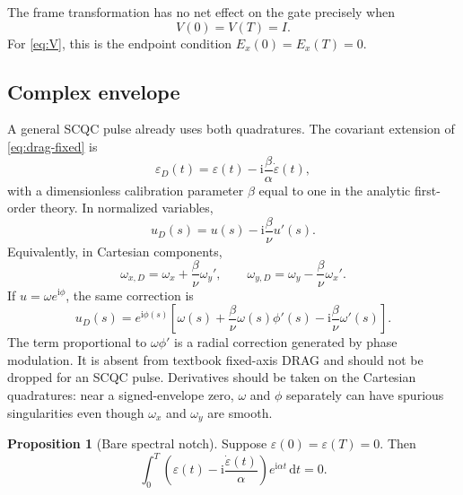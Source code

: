 \documentclass[11pt,a4paper]{article}
\theoremstyle{definition}
\newtheorem{proposition}{Proposition}
\newcommand{\dd}{\mathrm{d}}
\newcommand{\ii}{\mathrm{i}}
\newcommand{\eps}{\varepsilon}
\begin{document}
The frame transformation has no net effect on the gate precisely when
\begin{equation}
  V(0)=V(T)=I.
\end{equation}
For \eqref{eq:V}, this is the endpoint condition \(E_x(0)=E_x(T)=0\).

\subsection{Complex envelope}

A general SCQC pulse already uses both quadratures.  The covariant extension of
\eqref{eq:drag-fixed} is
\begin{equation}
\label{eq:drag-complex}
  \eps_D(t)=\eps(t)-\ii\frac{\beta}{\alpha}\dot\eps(t),
\end{equation}
with a dimensionless calibration parameter \(\beta\) equal to one in the
analytic first-order theory.  In normalized variables,
\begin{equation}
\label{eq:drag-u}
  u_D(s)=u(s)-\ii\frac{\beta}{\nu}u'(s).
\end{equation}
Equivalently, in Cartesian components,
\begin{equation}
\label{eq:drag-cartesian}
  \omega_{x,D}=\omega_x+\frac{\beta}{\nu}\omega_y',
  \qquad
  \omega_{y,D}=\omega_y-\frac{\beta}{\nu}\omega_x'.
\end{equation}
If \(u=\omega e^{\ii\phi}\), the same correction is
\begin{equation}
\label{eq:drag-polar}
  u_D(s)=e^{\ii\phi(s)}
  \left[\omega(s)+\frac{\beta}{\nu}\omega(s)\phi'(s)
        -\ii\frac{\beta}{\nu}\omega'(s)\right].
\end{equation}
The term proportional to \(\omega\phi'\) is a radial correction generated by
phase modulation.  It is absent from textbook fixed-axis DRAG and should not
be dropped for an SCQC pulse.  Derivatives should be taken on the Cartesian
quadratures: near a signed-envelope zero, \(\omega\) and \(\phi\) separately
can have spurious singularities even though \(\omega_x\) and \(\omega_y\) are
smooth.

\begin{proposition}[Bare spectral notch]
\label{prop:notch}
Suppose \(\eps(0)=\eps(T)=0\).  Then
\begin{equation}
  \int_0^T\left(\eps(t)-\ii\frac{\dot\eps(t)}{\alpha}\right)e^{\ii\alpha t}\,\dd t
  =0.
\end{equation}
\end{proposition}
\end{document}
